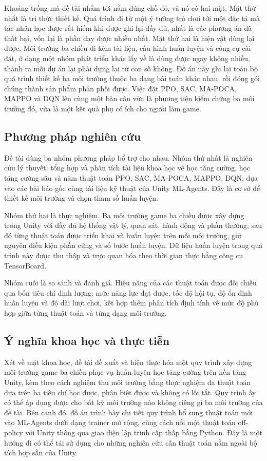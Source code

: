 \indent Khoảng trống mà đề tài nhắm tới nằm đúng chỗ đó, và nó có hai mặt. Mặt thứ nhất
là tri thức thiết kế. Quá trình đi từ một ý tưởng trò chơi tới một đặc tả mà tác
nhân học được rất hiếm khi được ghi lại đầy đủ, nhất là các phương án đã thất bại, vốn
lại là phần dạy được nhiều nhất. Mặt thứ hai là hiện vật dùng lại được. Môi
trường ba chiều đi kèm tài liệu, cấu hình huấn luyện và công cụ cài đặt, ở dạng một nhóm
phát triển khác lấy về là dùng được ngay không nhiều, thành ra mỗi dự án lại
phải dựng lại từ con số không. Đồ án này ghi lại toàn bộ quá trình thiết
kế ba môi trường thuộc ba dạng bài toán khác nhau, rồi đóng gói chúng thành sản phẩm phân
phối được. Việc đặt PPO, SAC, MA-POCA, MAPPO và DQN lên cùng một bàn cân vừa là phương tiện kiểm chứng ba môi trường đó, vừa là một kết quả phụ có ích cho người làm game.

\subsection{Phương pháp nghiên cứu}
\indent Đề tài dùng ba nhóm phương pháp bổ trợ cho nhau. Nhóm thứ nhất là nghiên cứu lý thuyết: tổng hợp và phân tích tài liệu khoa học về học tăng cường, học tăng cường sâu và
năm thuật toán PPO, SAC, MA-POCA, MAPPO, DQN, dựa vào các bài báo gốc cùng tài liệu kỹ
thuật của Unity ML-Agents. Đây là cơ sở để thiết kế môi trường và chọn tham số huấn luyện.

\indent Nhóm thứ hai là thực nghiệm. Ba môi trường game ba chiều được xây dựng trong Unity
với đầy đủ hệ thống vật lý, quan sát, hành động và phần thưởng; sau đó từng thuật toán
được triển khai và huấn luyện trên mỗi môi trường, giữ nguyên điều kiện phần cứng và số
bước huấn luyện. Dữ liệu huấn luyện trong quá trình này được thu thập và trực quan hóa
theo thời gian thực bằng công cụ TensorBoard.

\indent Nhóm cuối là so sánh và đánh giá. Hiệu năng của các thuật toán được đối chiếu qua
bốn tiêu chí định lượng: mức năng lực đạt được, tốc độ hội tụ, độ ổn định huấn luyện và
độ dài lượt chơi, kết hợp thêm phân tích định tính về mức độ phù hợp giữa từng thuật
toán và từng dạng môi trường.

\subsection{Ý nghĩa khoa học và thực tiễn}

\indent Xét về mặt khoa học, đề tài đề xuất và hiện thực hóa một quy trình xây dựng môi
trường game ba chiều phục vụ huấn luyện học tăng cường trên nền tảng Unity, kèm theo cách
nghiệm thu môi trường bằng thực nghiệm đa thuật toán dựa trên ba tiêu chí học được,
phân biệt được và không có lối tắt. Quy trình ấy có thể áp dụng được cho bất kỳ môi trường nào không riêng gì ba môi trường của đề tài. Bên cạnh đó, đồ án trình bày chi tiết
quy trình bổ sung thuật toán mới vào ML-Agents dưới dạng trainer mở rộng, cùng cách nối
một thuật toán off-policy với Unity thông qua giao diện lập trình cấp thấp bằng Python.
Đây là một hướng đi có thể tái sử dụng cho những nghiên cứu cần thuật toán nằm ngoài bộ
tích hợp sẵn của Unity.

